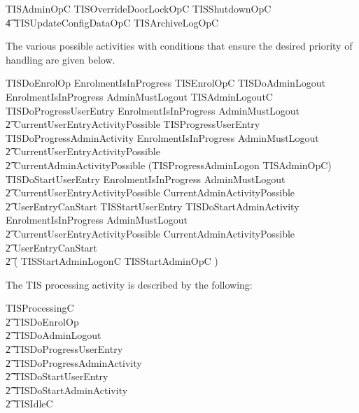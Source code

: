 \begin{zed}
        TISAdminOpC  TISOverrideDoorLockOpC  \lor TISShutdownOpC 
\\      \t4     \lor TISUpdateConfigDataOpC \lor TISArchiveLogOpC
\end{zed}

The various possible activities with conditions that ensure the
desired priority of handling are given below.
\begin{zed}
        TISDoEnrolOp  EnrolmentIsInProgress \land TISEnrolOpC
\also
        TISDoAdminLogout  \lnot EnrolmentIsInProgress \land
        AdminMustLogout \land TISAdminLogoutC
\also
        TISDoProgressUserEntry  \lnot EnrolmentIsInProgress
        \land \lnot AdminMustLogout 
\\ \t2  \land
        CurrentUserEntryActivityPossible \land TISProgressUserEntry
\also
        TISDoProgressAdminActivity  \lnot EnrolmentIsInProgress
        \land \lnot AdminMustLogout 
\\ \t2  \land
        \lnot CurrentUserEntryActivityPossible \land 
\\ \t2  CurrentAdminActivityPossible \land (TISProgressAdminLogon \lor TISAdminOpC)
\also
        TISDoStartUserEntry  \lnot EnrolmentIsInProgress
        \land \lnot AdminMustLogout 
\\ \t2  \land
        \lnot CurrentUserEntryActivityPossible \land 
        \lnot CurrentAdminActivityPossible 
\\ \t2  \land UserEntryCanStart \land TISStartUserEntry
\also
        TISDoStartAdminActivity  \lnot EnrolmentIsInProgress
        \land \lnot AdminMustLogout 
\\ \t2  \land \lnot CurrentUserEntryActivityPossible \land 
        \lnot CurrentAdminActivityPossible 
\\ \t2  \land \lnot UserEntryCanStart 
\\ \t2  \land ( TISStartAdminLogonC  \lor TISStartAdminOpC )

\end{zed}

The TIS processing activity is described by the following:

\begin{zed}
        TISProcessingC   
\\ \t2	     TISDoEnrolOp 
\\ \t2  \lor TISDoAdminLogout
\\ \t2  \lor TISDoProgressUserEntry
\\ \t2  \lor TISDoProgressAdminActivity
\\ \t2  \lor TISDoStartUserEntry
\\ \t2  \lor TISDoStartAdminActivity 
\\ \t2  \lor TISIdleC
\end{zed}

